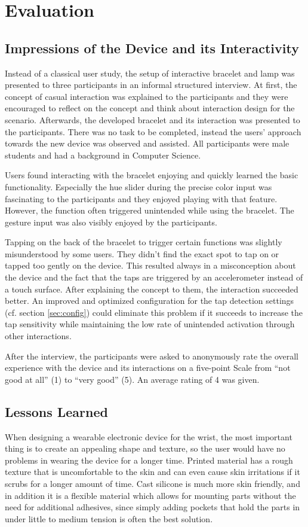 \chapter{Evaluation}
\label{chap:evaluation}
\section{Impressions of the Device and its Interactivity}
Instead of a classical user study, the setup of interactive bracelet and lamp was presented to three participants in an informal structured interview. At first, the concept of casual interaction was explained to the participants and they were encouraged to reflect on the concept and think about interaction design for the scenario. Afterwards, the developed bracelet and its interaction was presented to the participants. There was no task to be completed, instead the users' approach towards the new device was observed and assisted. All participants were male students and had a background in Computer Science.

Users found interacting with the bracelet enjoying and quickly learned the basic functionality. Especially the hue slider during the precise color input was fascinating to the participants and they enjoyed playing with that feature. However, the function often triggered unintended while using the bracelet. The gesture input was also visibly enjoyed by the participants.

Tapping on the back of the bracelet to trigger certain functions was slightly misunderstood by some users. They didn't find the exact spot to tap on or tapped too gently on the device. This resulted always in a misconception about the device and the fact that the taps are triggered by an accelerometer instead of a touch surface. After explaining the concept to them, the interaction succeeded better. An improved and optimized configuration for the tap detection settings (cf. section \ref{sec:config}) could eliminate this problem if it succeeds to increase the tap sensitivity while maintaining the low rate of unintended activation through other interactions.

After the interview, the participants were asked to anonymously rate the overall experience with the device and its interactions on a five-point Scale from ``not good at all'' (1) to ``very good'' (5). An average rating of 4 was given.

\section{Lessons Learned}
When designing a wearable electronic device for the wrist, the most important thing is to create an appealing shape and texture, so the user would have no problems in wearing the device for a longer time. Printed material has a rough texture that is uncomfortable to the skin and can even cause skin irritations if it scrubs for a longer amount of time. Cast silicone is much more skin friendly, and in addition it is a flexible material which allows for mounting parts without the need for additional adhesives, since simply adding pockets that hold the parts in under little to medium tension is often the best solution.

